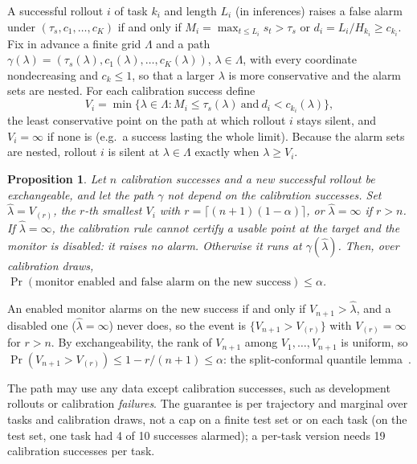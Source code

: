 \documentclass[conference]{IEEEtran}
\newtheorem{proposition}{Proposition}
\begin{document}
A successful rollout $i$ of task $k_i$ and length $L_i$ (in inferences) raises a false alarm
under $(\tau_s, c_1, \dots, c_K)$ if and only if $M_i = \max_{t \le L_i} s_t > \tau_s$ or
$d_i = L_i/H_{k_i} \ge c_{k_i}$. Fix in advance a finite grid $\Lambda$ and a path
$\gamma(\lambda) = (\tau_s(\lambda), c_1(\lambda), \dots, c_K(\lambda))$, $\lambda \in \Lambda$,
with every coordinate nondecreasing and $c_k \le 1$, so that a larger $\lambda$ is more
conservative and the alarm sets are nested. For each calibration success define
\begin{equation}
  V_i = \min\{\lambda \in \Lambda : M_i \le \tau_s(\lambda) \ \text{and}\ d_i < c_{k_i}(\lambda)\},
\end{equation}
the least conservative point on the path at which rollout $i$ stays silent, and $V_i = \infty$
if none is (e.g.\ a success lasting the whole limit).
Because the alarm sets are nested, rollout $i$ is silent at $\lambda \in \Lambda$ exactly when
$\lambda \ge V_i$.

\begin{proposition}
\label{prop:fpr}
Let $n$ calibration successes and a new successful rollout be exchangeable, and let the path
$\gamma$ not depend on the calibration successes. Set $\hat\lambda = V_{(r)}$, the $r$-th smallest
$V_i$ with $r = \lceil (n+1)(1-\alpha) \rceil$, or $\hat\lambda = \infty$ if $r > n$. If
$\hat\lambda = \infty$, the calibration rule cannot certify a usable point at the target and the
monitor is disabled: it raises no alarm. Otherwise it runs at $\gamma(\hat\lambda)$. Then, over
calibration draws, $\Pr(\text{monitor enabled and false alarm on the new success}) \le \alpha$.
\end{proposition}
\begin{IEEEproof}
An enabled monitor alarms on the new success if and only if $V_{n+1} > \hat\lambda$, and a
disabled one ($\hat\lambda = \infty$) never does, so the event is $\{V_{n+1} > V_{(r)}\}$ with
$V_{(r)} = \infty$ for $r > n$. By exchangeability, the rank of $V_{n+1}$ among
$V_1, \dots, V_{n+1}$ is uniform, so $\Pr(V_{n+1} > V_{(r)}) \le
1 - r/(n+1) \le \alpha$: the split-conformal quantile lemma~\cite{angelopoulos2021gentle}.
\end{IEEEproof}

The path may use any data except calibration successes, such as development rollouts or
calibration \emph{failures}. The guarantee is per trajectory and marginal over tasks and
calibration draws, not a cap on a finite test set or on each task (on the test set, one task
had 4 of 10 successes alarmed); a per-task version needs 19 calibration successes per task.
\end{document}
